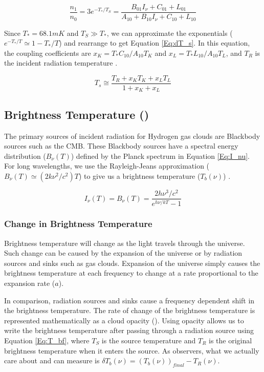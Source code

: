 \begin{equation}
\frac{n_1}{n_0} = 3 e^{-T_*/T_S} = \frac{B_{01} I_\nu + C_{01}+ L_{01}}{A_{10}+ B_{10} I_\nu + C_{10} +L_{10}}
\end{equation}

Since $T_* = 68.1 mK$ and $T_S \gg T_*$, we can approximate the exponentials ($e^{-T_*/T} \simeq 1-T_*/T$) and rearrange to get Equation \ref{Eq:dT_s}. In this equation, the coupling coefficients are $x_K = T_* C_{10}/A_{10} T_K$ and $x_L = T_* L_{10} / A_{10} T_L$, and $T_R$ is the incident \cm radiation temperature \cite{field_1958}.

\begin{equation}\label{Eq:dT_s}
T_s \cong \frac{T_{R} + x_K T_{K} + x_{L} T_{L}}{1+x_K +x_{L}}
\end{equation}


\subsection{Brightness Temperature (\tb)}

The primary sources of incident radiation for Hydrogen gas clouds are Blackbody sources such as the CMB. These Blackbody sources have a spectral energy distribution ($B_\nu (T)$) defined by the Planck spectrum in Equation \ref{Eq:I_nu}. For long wavelengths, we use the Rayleigh-Jeans approximation ($B_{\nu} (T) \simeq (2 k \nu^2 / c^2) T$) to give us a brightness temperature ($T_b (\nu)$) \cite{carroll2007}. 

\begin{equation} \label{Eq:I_nu}
I_{\nu} (T) = B_{\nu}(T) = \frac{ 2 h \nu^3 / c^2}{e^{h \nu / k T}-1}
\end{equation}


\subsubsection{Change in Brightness Temperature}

Brightness temperature will change as the light travels through the universe. Such change can be caused by the expansion of the universe or by radiation sources and sinks such as gas clouds. Expansion of the universe simply causes the brightness temperature at each frequency to change at a rate proportional to the expansion rate ($a$). 

In comparison, radiation sources and sinks cause a frequency dependent shift in the brightness temperature. The rate of change of the brightness temperature is represented mathematically as a cloud opacity (\tu). Using opacity allows us to write the brightness temperature after passing through a radiation source using Equation \ref{Eq:T_bf}, where $T_{S}$ is the source temperature and $T_{R}$ is the original brightness temperature when it enters the source. As observers, what we actually care about and can measure is $\delta T_b (\nu) = (T_b (\nu))_{final} - T_R  (\nu)$. 

